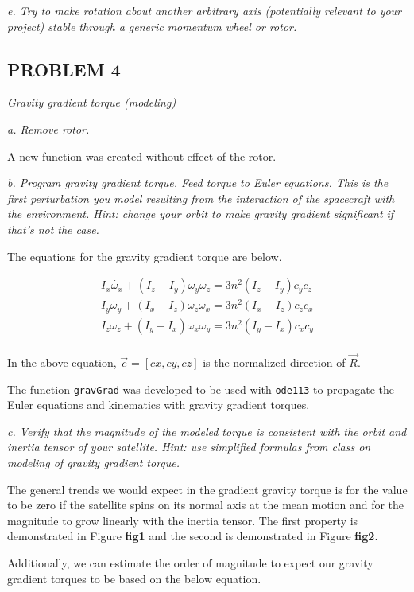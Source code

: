 \textit{e. Try to make rotation about another arbitrary axis (potentially relevant to your project) stable through a generic momentum wheel or rotor.}

\subsection{PROBLEM 4}
\textit{Gravity gradient torque (modeling)}

\textit{a. Remove rotor.}

A new function was created without effect of the rotor.

\textit{b. Program gravity gradient torque. Feed torque to Euler equations. This is the first perturbation you model resulting from the interaction of the spacecraft with the environment. Hint: change your orbit to make gravity gradient significant if that’s not the case.}

The equations for the gravity gradient torque are below.

\begin{align*}
    I_x \dot{\omega_x} + (I_z - I_y) \omega_y \omega_z = 3 n^2 (I_z - I_y) c_y c_z \\
    I_y \dot{\omega_y} + (I_x - I_z) \omega_z \omega_x = 3 n^2 (I_x - I_z) c_z c_x \\
    I_z \dot{\omega_z} + (I_y - I_x) \omega_x \omega_y = 3 n^2 (I_y - I_x) c_x c_y \\
\end{align*}

In the above equation, $\Vec{c} = [cx, cy, cz]$ is the normalized direction of $\Vec{R}$.

The function \texttt{gravGrad} was developed to be used with \texttt{ode113} to propagate the Euler equations and kinematics with gravity gradient torques.



\textit{c. Verify that the magnitude of the modeled torque is consistent with the orbit and inertia tensor of your satellite. Hint: use simplified formulas from class on modeling of gravity gradient torque.}

The general trends we would expect in the gradient gravity torque is for the value to be zero if the satellite spins on its normal axis at the mean motion and for the magnitude to grow linearly with the inertia tensor. The first property is demonstrated in Figure \textbf{fig1} and the second is demonstrated in Figure \textbf{fig2}.

Additionally, we can estimate the order of magnitude to expect our gravity gradient torques to be based on the below equation.

